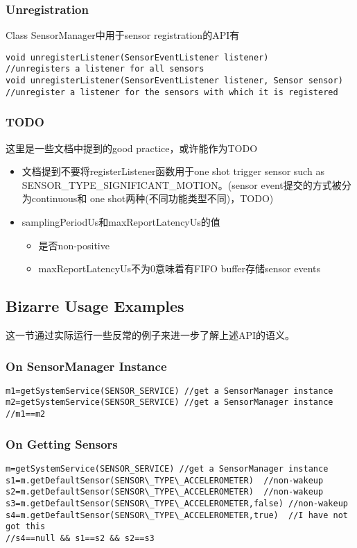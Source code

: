 {\subsubsection{Unregistration}
Class SensorManager中用于sensor registration的API有
\begin{lstlisting}
void unregisterListener(SensorEventListener listener)
//unregisters a listener for all sensors
void unregisterListener(SensorEventListener listener, Sensor sensor)
//unregister a listener for the sensors with which it is registered
\end{lstlisting}

\subsubsection{TODO}
这里是一些文档中提到的good practice，或许能作为TODO
\begin{itemize}
  \item 文档提到不要将registerListener函数用于one shot trigger sensor such as
SENSOR\_TYPE\_SIGNIFICANT\_MOTION。(sensor event提交的方式被分为continuous和
one shot两种(不同功能类型不同)，TODO)
  \item samplingPeriodUs和maxReportLatencyUs的值
    \begin{itemize}
      \item 是否non-positive
      \item maxReportLatencyUs不为0意味着有FIFO buffer存储sensor events
    \end{itemize}
\end{itemize}

\subsection{Bizarre Usage Examples}
这一节通过实际运行一些反常的例子来进一步了解上述API的语义。
\subsubsection{On SensorManager Instance}
\begin{lstlisting}
m1=getSystemService(SENSOR_SERVICE) //get a SensorManager instance
m2=getSystemService(SENSOR_SERVICE) //get a SensorManager instance
//m1==m2
\end{lstlisting}

\subsubsection{On Getting Sensors}
\begin{lstlisting}
m=getSystemService(SENSOR_SERVICE) //get a SensorManager instance
s1=m.getDefaultSensor(SENSOR\_TYPE\_ACCELEROMETER)  //non-wakeup
s2=m.getDefaultSensor(SENSOR\_TYPE\_ACCELEROMETER)  //non-wakeup
s3=m.getDefaultSensor(SENSOR\_TYPE\_ACCELEROMETER,false) //non-wakeup
s4=m.getDefaultSensor(SENSOR\_TYPE\_ACCELEROMETER,true)  //I have not got this
//s4==null && s1==s2 && s2==s3


\end{lstlisting}}
